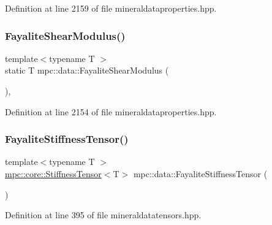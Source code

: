 Definition at line 2159 of file mineraldataproperties.\+hpp.

\mbox{\label{namespacempc_1_1data_a7d3601cc203324a07c9fbe1b2bada6e4}} 
\subsubsection{\texorpdfstring{Fayalite\+Shear\+Modulus()}{FayaliteShearModulus()}}
{\footnotesize\ttfamily template$<$typename T $>$ \\
static T mpc\+::data\+::\+Fayalite\+Shear\+Modulus (\begin{DoxyParamCaption}{ }\end{DoxyParamCaption})\hspace{0.3cm}{\ttfamily [inline]}, {\ttfamily [static]}}



Definition at line 2154 of file mineraldataproperties.\+hpp.

\mbox{\label{namespacempc_1_1data_a376bcd58bd7cbedd5496301ba2872b46}} 
\subsubsection{\texorpdfstring{Fayalite\+Stiffness\+Tensor()}{FayaliteStiffnessTensor()}}
{\footnotesize\ttfamily template$<$typename T $>$ \\
\mbox{\hyperlink{structmpc_1_1core_1_1_stiffness_tensor}{mpc\+::core\+::\+Stiffness\+Tensor}}$<$T$>$ mpc\+::data\+::\+Fayalite\+Stiffness\+Tensor (\begin{DoxyParamCaption}{ }\end{DoxyParamCaption})}



Definition at line 395 of file mineraldatatensors.\+hpp.

\mbox{\label{namespacempc_1_1data_a4db255692252d949423c0ad3d1542246}} 
